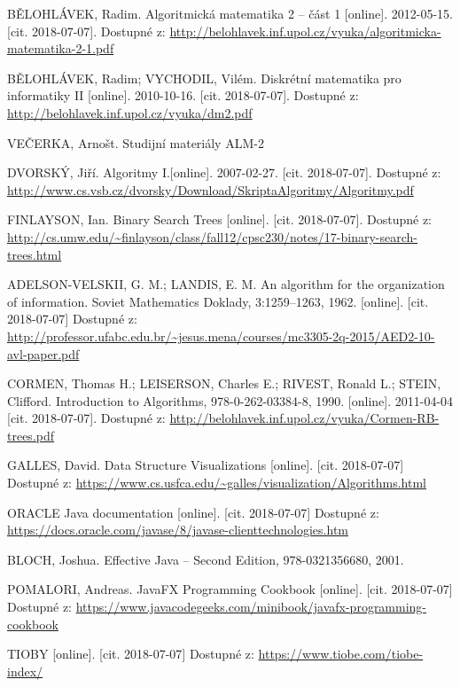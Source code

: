 \documentclass[
  biblatex=false,
  font=serif,
  glossaries=false,
  tables=false,
  theorems=false,
  index
]{kidiplom}
\begin{document}
\begin{thebibliography}{99}	

 \uppercase{BĚlohlávek}, Radim. Algoritmická matematika 2 -- část 1 [online]. 2012-05-15. [cit. 2018-07-07]. Dostupné z: \url{http://belohlavek.inf.upol.cz/vyuka/algoritmicka-matematika-2-1.pdf}

 \uppercase{BĚlohlávek}, Radim; \uppercase{Vychodil}, Vilém. Diskrétní matematika pro informatiky II [online]. 2010-10-16. [cit. 2018-07-07]. Dostupné z: \url{http://belohlavek.inf.upol.cz/vyuka/dm2.pdf}

 \uppercase{veČerka}, Arnošt. Studijní materiály ALM-2

 \uppercase{DvorskÝ}, Jiří. Algoritmy I.[online]. 2007-02-27. [cit. 2018-07-07]. Dostupné z: \url{http://www.cs.vsb.cz/dvorsky/Download/SkriptaAlgoritmy/Algoritmy.pdf}

 \uppercase{Finlayson}, Ian. Binary Search Trees [online]. [cit. 2018-07-07].
Dostupné z: \url{http://cs.umw.edu/~finlayson/class/fall12/cpsc230/notes/17-binary-search-trees.html}

 \uppercase{Adelson-Velskii}, G. M.; \uppercase{Landis}, E. M. An algorithm for the organization of information. Soviet Mathematics Doklady, 3:1259–1263, 1962. [online]. [cit. 2018-07-07] Dostupné z: \url{http://professor.ufabc.edu.br/~jesus.mena/courses/mc3305-2q-2015/AED2-10-avl-paper.pdf}

 \uppercase{Cormen}, Thomas H.; \uppercase{Leiserson}, Charles E.; \uppercase{Rivest}, Ronald L.; \uppercase{Stein}, Clifford. Introduction to Algorithms, 978-0-262-03384-8, 1990. [online]. 2011-04-04  [cit. 2018-07-07]. Dostupné z: \url{http://belohlavek.inf.upol.cz/vyuka/Cormen-RB-trees.pdf}

 \uppercase{Galles}, David. Data Structure Visualizations [online]. [cit. 2018-07-07]
Dostupné z: \url{https://www.cs.usfca.edu/~galles/visualization/Algorithms.html}

 ORACLE Java documentation [online]. [cit. 2018-07-07] Dostupné z: \url{https://docs.oracle.com/javase/8/javase-clienttechnologies.htm}

 \uppercase{Bloch}, Joshua. Effective Java -- Second Edition, 978-0321356680, 2001.

 \uppercase{Pomalori}, Andreas. JavaFX Programming Cookbook [online]. [cit. 2018-07-07] Dostupné z: \url{https://www.javacodegeeks.com/minibook/javafx-programming-cookbook}

 \uppercase{Tioby} [online]. [cit. 2018-07-07] Dostupné z: \url{https://www.tiobe.com/tiobe-index/}


\end{thebibliography}
\end{document}
